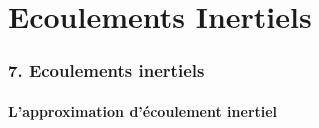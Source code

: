 
\part{Ecoulements Inertiels}


\section*{\bfseries 7. Ecoulements inertiels}

%  
%
%


\subsection{L'approximation d'écoulement inertiel}

